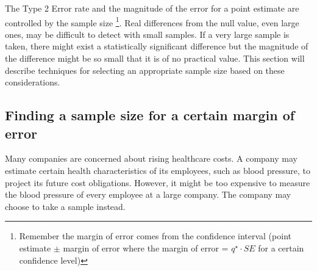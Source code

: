 The Type 2 Error rate and the magnitude of the error for a point estimate are controlled by the sample size \footnote{Remember the margin of error comes from the confidence interval (point estimate $\pm$ margin of error where the margin of error = $q^{\star} \cdot SE$ for a certain confidence level)}. Real differences from the null value, even large ones, may be difficult to detect with small samples. If a very large sample is taken, there might exist a statistically significant difference but the magnitude of the difference might be so small that it is of no practical value. This section will describe techniques for selecting an appropriate sample size based on these considerations.

\subsection{Finding a sample size for a certain margin of error}
\label{findingASampleSizeForACertainME}


Many companies are concerned about rising healthcare costs. A company may estimate certain health characteristics of its employees, such as blood pressure, to project its future cost obligations. However, it might be too expensive to measure the blood pressure of every employee at a large company. The company may choose to take a sample instead.

